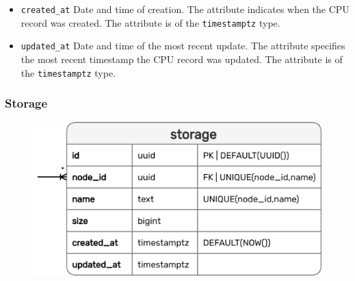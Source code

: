 \begin{itemize}
  \item \texttt{created\_at}
    \newline
    Date and time of creation.
    \newline
    The attribute indicates when the CPU record was created.
    \newline
    The attribute is of the \texttt{timestamptz} type.

  \item \texttt{updated\_at}
    \newline
    Date and time of the most recent update.
    \newline
    The attribute specifies the most recent timestamp the CPU record was updated.
    \newline
    The attribute is of the \texttt{timestamptz} type.
\end{itemize}

\pagebreak


\subsubsection{Storage}
\label{subsubsec:implementation_server_database_storage}

\begin{figure}
  \centering
  \includegraphics[width=\linewidth]{images/implementation/erm_storage.png}
\end{figure}

